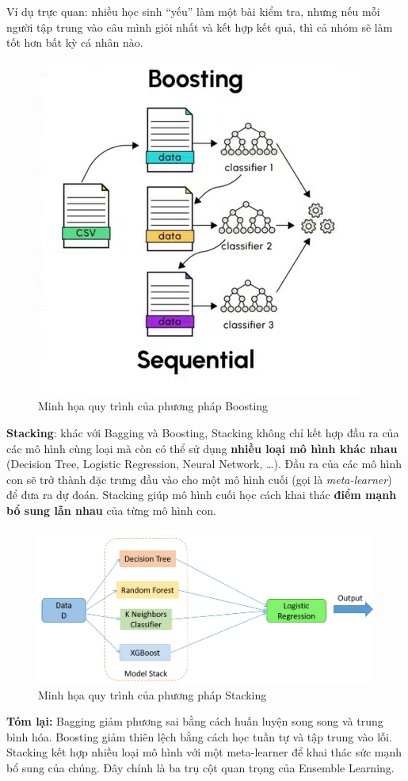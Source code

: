 \documentclass[11pt]{article}
\begin{document}
Ví dụ trực quan: nhiều học sinh “yếu” làm một bài kiểm tra, nhưng nếu mỗi người tập trung vào câu mình giỏi nhất và kết hợp kết quả, thì cả nhóm sẽ làm tốt hơn bất kỳ cá nhân nào.  

\begin{figure}[H]
    \centering
    \includegraphics[width=0.4\linewidth]{images/boosting.png}
    \caption{Minh họa quy trình của phương pháp Boosting}
\end{figure}

\textbf{Stacking}: khác với Bagging và Boosting, Stacking không chỉ kết hợp đầu ra của các mô hình cùng loại mà còn có thể sử dụng \textbf{nhiều loại mô hình khác nhau} (Decision Tree, Logistic Regression, Neural Network, …). Đầu ra của các mô hình con sẽ trở thành đặc trưng đầu vào cho một mô hình cuối (gọi là \textit{meta-learner}) để đưa ra dự đoán. Stacking giúp mô hình cuối học cách khai thác \textbf{điểm mạnh bổ sung lẫn nhau} của từng mô hình con.  

\begin{figure}[H]
    \centering
    \includegraphics[width=0.7\linewidth]{images/stacking.png}
    \caption{Minh họa quy trình của phương pháp Stacking}
\end{figure}

\textbf{Tóm lại:} Bagging giảm phương sai bằng cách huấn luyện song song và trung bình hóa. Boosting giảm thiên lệch bằng cách học tuần tự và tập trung vào lỗi. Stacking kết hợp nhiều loại mô hình với một meta-learner để khai thác sức mạnh bổ sung của chúng. Đây chính là ba trụ cột quan trọng của Ensemble Learning.
\end{document}
